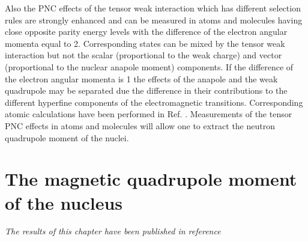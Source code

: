\documentclass[8pt,a4paper, twoside]{report}
\begin{document}
Also the PNC effects of the tensor weak interaction which has different selection rules are strongly enhanced  and can be measured in atoms and molecules having close opposite parity energy levels with the difference of the electron angular momenta equal to 2. Corresponding states can be mixed by the tensor weak interaction but not the scalar (proportional to the  weak charge) and vector (proportional to the nuclear anapole moment) components. If the difference of the electron angular momenta is 1 the effects of the anapole and the weak quadrupole may be separated due the difference in their contributions to the different hyperfine components of the electromagnetic transitions. Corresponding atomic calculations have been performed in Ref.  \cite{FDC17}. Measurements of the tensor PNC effects in atoms and molecules will allow one to extract  the neutron quadrupole moment of the nuclei. \\

\chapter{The magnetic quadrupole moment of the nucleus}
\textit{The results of this chapter have been published in reference \cite{LFMQM2018}} \\
\linebreak

\iffalse
\end{document}
